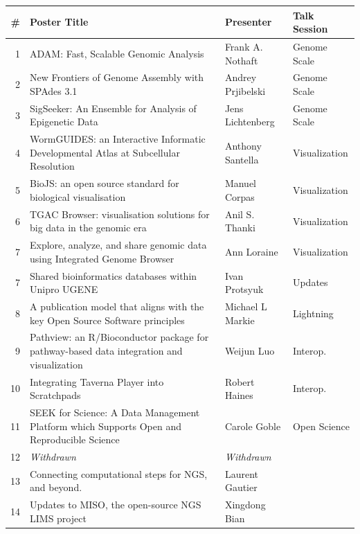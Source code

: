 \documentclass[12pt,oneside]{article}
\begin{document}
\begin{center}
\begin{tabular}{|r|p{10.5cm}|p{3.2cm}|p{2.5cm}|}
\hline
\# & Poster Title & Presenter & Talk Session \\
\hline
1 & ADAM: Fast, Scalable Genomic Analysis & Frank A. Nothaft & Genome Scale \\
2 & New Frontiers of Genome Assembly with SPAdes 3.1 & Andrey Prjibelski & Genome Scale \\
3 & SigSeeker: An Ensemble for Analysis of Epigenetic Data & Jens Lichtenberg & Genome Scale \\
4 & WormGUIDES: an Interactive Informatic Developmental Atlas at Subcellular Resolution & Anthony Santella & Visualization \\
5 & BioJS: an open source standard for biological visualisation & Manuel Corpas & Visualization \\
6 & TGAC Browser: visualisation solutions for big data in the genomic era & Anil S. Thanki & Visualization \\
7 & Explore, analyze, and share genomic data using Integrated Genome Browser & Ann Loraine & Visualization \\
7 & Shared bioinformatics databases within Unipro UGENE & Ivan Protsyuk & Updates \\
8 & A publication model that aligns with the key Open Source Software principles & Michael L Markie & Lightning \\
9 & Pathview: an R/Bioconductor package for pathway-based data integration and visualization & Weijun Luo & Interop. \\
10 & Integrating Taverna Player into Scratchpads & Robert Haines & Interop. \\
11 & SEEK for Science: A Data Management Platform which Supports Open and Reproducible Science & Carole Goble & Open Science \\
\hline
12 & \textit{Withdrawn} & \textit{Withdrawn} & \\
13 & Connecting computational steps for NGS, and beyond. & Laurent Gautier &  \\
14 & Updates to MISO, the open-source NGS LIMS project & Xingdong Bian &  \\

\end{tabular}
\end{center}
\end{document}
